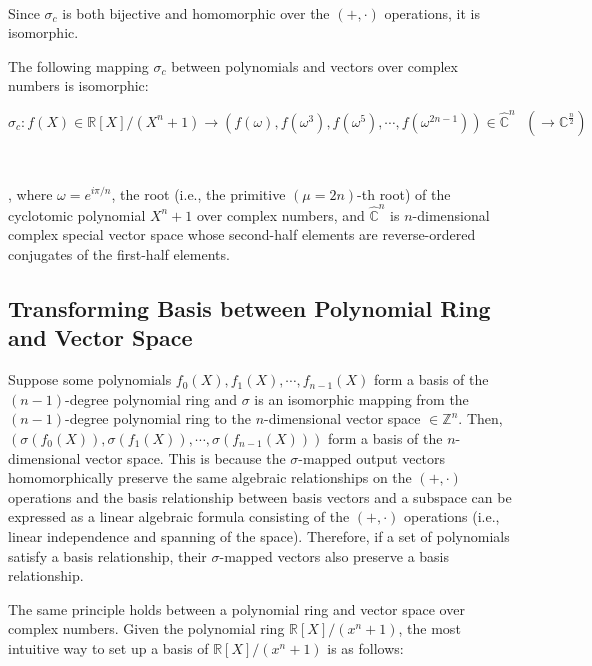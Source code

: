 $ $

Since $\sigma_c$ is both bijective and homomorphic over the $(+, \cdot)$ operations, it is isomorphic. 


\begin{tcolorbox}[title={\textbf{\tboxtheorem{\ref*{subsec:poly-vector-transformation-complex}} Isomorphism between Polynomials and Vectors over Complex Numbers}}]

The following mapping $\sigma_c$ between polynomials and vectors over complex numbers is isomorphic:

$\sigma_c: f(X) \in \mathbb{R}[X]/(X^n + 1) \longrightarrow (f(\omega),f(\omega^3),f(\omega^5), \cdots, f(\omega^{2n-1})) \in \mathbb{\hat{C}}^{n} \text{ } (\longrightarrow \mathbb{C}^{\frac{n}{2}})$

$ $

, where $\omega = e^{i\pi/n}$, the root (i.e., the primitive $(\mu=2n)$-th root) of the cyclotomic polynomial $X^n + 1$ over complex numbers, and $\mathbb{\hat{C}}^{n}$ is $n$-dimensional complex special vector space whose second-half elements are reverse-ordered conjugates of the first-half elements. 

\end{tcolorbox}


\subsection{Transforming Basis between Polynomial Ring and Vector Space}
\label{subsec:poly-vector-basis-transfer}


Suppose some polynomials $f_0(X), f_1(X), \cdots, f_{n-1}(X)$ form a basis of the $(n-1)$-degree polynomial ring and $\sigma$ is an isomorphic mapping from the $(n-1)$-degree polynomial ring to the $n$-dimensional vector space $\in \mathbb{Z}^n$. Then, $(\sigma(f_0(X)), \sigma(f_1(X)), \cdots, \sigma(f_{n-1}(X)))$ form a basis of the $n$-dimensional vector space. This is because the $\sigma$-mapped output vectors homomorphically preserve the same algebraic relationships on the $(+, \cdot)$ operations and the basis relationship between basis vectors and a subspace can be expressed as a linear algebraic formula consisting of the $(+, \cdot)$ operations (i.e., linear independence and spanning of the space). Therefore, if a set of polynomials satisfy a basis relationship, their $\sigma$-mapped vectors also preserve a basis relationship.

The same principle holds between a polynomial ring and vector space over complex numbers. Given the polynomial ring $\mathbb{R}[X]/(x^n + 1)$, the most intuitive way to set up a basis of $\mathbb{R}[X]/(x^n + 1)$ is as follows:

